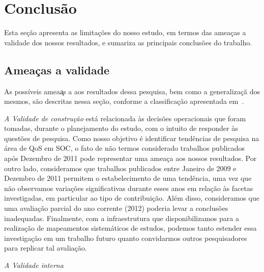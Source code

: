 \section{Conclus\~{a}o}\label{sec:conclusao}

Esta se\c c\~{a}o apresenta as limita\c c\~{o}es do nosso estudo, em
termos das amea\c cas a validade dos nossos resultados, e sumariza as principais
conclus\~{o}es do trabalho. 
 
\subsection{Amea\c cas a validade}

As poss\'{i}veis amea\c as a aos 
resultados dessa pesquisa, bem como a generaliza\c c\~{a} dos mesmos, 
s\~{a}o descritas nessa se\c c\~{a}o, conforme a 
classifica\c c\~{a}o apresentada
em~\cite{leedy1980practical}. 

\noindent
\emph{A Validade de constru\c c\~{a}o} est\'{a} relacionada
\`{a}s decis\~{o}es operacionais que foram tomadas, durante o
planejamento do estudo, com o intuito de responder \`{a}s quest\~{o}es de
pesquisa. Como nosso objetivo \'{e} identificar
tend\^{e}ncias de pesquisa na \'{a}rea de QoS em SOC, o fato de
n\~{a}o termos considerado trabalhos publicados ap\'{o}s Dezembro de
2011 pode representar uma amea\c ca aos nossos resultados. Por outro
lado, consideramos que trabalhos publicados entre Janeiro de 2009 e
Dezembro de 2011 permitem o estabelecimento de uma tend\^{e}ncia,
uma vez que n\~{a}o observamos varia\c c\~{o}es significativas durante
esses anos em rela\c c\~{a}o \`{a}s facetas investigadas, em particular ao tipo de
contribui\c c\~{a}o. Al\'{e}m disso, consideramos que uma avalia\c c\~{a}o parcial 
do ano corrente (2012) poderia levar a conclus\~{o}es
inadequadas. Finalmente, com a infraestrutura que disponibilizamos para a realiza\c
c\~{a}o de mapeamentos sistem\'{a}ticos de estudos, podemos tanto estender 
essa investiga\c c\~{a}o em um trabalho futuro quanto convidarmos outros 
pesquisadores para replicar tal avalia\c c\~{a}o. 

\noindent
\emph{A Validade interna}

